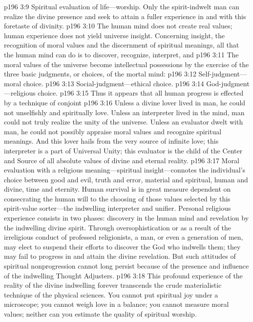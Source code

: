 \pc \vs p196 3:9 \bibnobreakspace Spiritual evaluation of life---worship. Only the spirit\hyp{}indwelt man can realize the divine presence and seek to attain a fuller experience in and with this foretaste of divinity.
\pc \vs p196 3:10 The human mind does not create real values; human experience does not yield universe insight. Concerning insight, the recognition of moral values and the discernment of spiritual meanings, all that the human mind can do is to discover, recognize, interpret, and 
\vs p196 3:11 The moral values of the universe become intellectual possessions by the exercise of the three basic judgments, or choices, of the mortal mind:
\pc \vs p196 3:12 \bibnobreakspace Self\hyp{}judgment---moral choice.
\vs p196 3:13 \bibnobreakspace Social\hyp{}judgment---ethical choice.
\vs p196 3:14 \bibnobreakspace God\hyp{}judgment---religious choice.
\pc \vs p196 3:15 Thus it appears that all human progress is effected by a technique of conjoint 
\vs p196 3:16 Unless a divine lover lived in man, he could not unselfishly and spiritually love. Unless an interpreter lived in the mind, man could not truly realize the unity of the universe. Unless an evaluator dwelt with man, he could not possibly appraise moral values and recognize spiritual meanings. And this lover hails from the very source of infinite love; this interpreter is a part of Universal Unity; this evaluator is the child of the Center and Source of all absolute values of divine and eternal reality.
\vs p196 3:17 Moral evaluation with a religious mean\-ing---spiritual insight---connotes the individual’s choice between good and evil, truth and error, material and spiritual, human and divine, time and eternity. Human survival is in great measure dependent on consecrating the human will to the choosing of those values selected by this spirit\hyp{}value sorter---the indwelling interpreter and unifier. Personal religious experience consists in two phases: discovery in the human mind and revelation by the indwelling divine spirit. Through oversophistication or as a result of the irreligious conduct of professed religionists, a man, or even a generation of men, may elect to suspend their efforts to discover the God who indwells them; they may fail to progress in and attain the divine revelation. But such attitudes of spiritual nonprogression cannot long persist because of the presence and influence of the indwelling Thought Adjusters.
\vs p196 3:18 This profound experience of the reality of the divine indwelling forever transcends the crude materialistic technique of the physical sciences. You cannot put spiritual joy under a microscope; you cannot weigh love in a balance; you cannot measure moral values; neither can you estimate the quality of spiritual worship.
